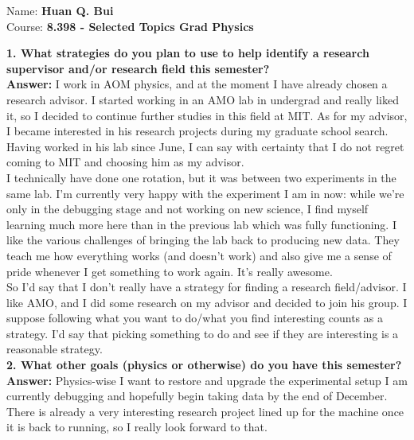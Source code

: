 \documentclass{article}
\theoremstyle{definition}
\begin{document}
		\begin{framed}
			\noindent Name: \textbf{Huan Q. Bui}\\
			Course: \textbf{8.398 - Selected Topics Grad Physics}
		\end{framed}
	
	
	
\noindent \textbf{1. What strategies do you plan to use to help identify a research supervisor and/or research field this semester?}\\


\noindent \textbf{Answer: } I work in AOM physics, and at the moment I have already chosen a research advisor. I started working in an AMO lab in undergrad and really liked it, so I decided to continue further studies in this field at MIT. As for my advisor, I became interested in his research projects during my graduate school search. Having worked in his lab since June, I can say with certainty that I do not regret coming to MIT and choosing him as my advisor. \\

\noindent I technically have done one rotation, but it was between two experiments in the same lab. I'm currently very happy with the experiment I am in now: while we're only in the debugging stage and not working on new science, I find myself learning much more here than in the previous lab which was fully functioning. I like the various challenges of bringing the lab back to producing new data. They teach me how everything works (and doesn't work) and also give me a sense of pride whenever I get something to work again. It's really awesome.  \\

\noindent So I'd say that I don't really have a strategy for finding a research field/advisor. I like AMO, and I did some research on my advisor and decided to join his group. I suppose following what you want to do/what you find interesting counts as a strategy. I'd say that picking something to do and see if they are interesting is a reasonable strategy.\\  

\noindent \textbf{2. What other goals (physics or otherwise) do you have this semester?}\\


\noindent \textbf{Answer:} Physics-wise I want to restore and upgrade the experimental setup I am currently debugging and hopefully begin taking data by the end of December. There is already a very interesting research project lined up for the machine once it is back to running, so I really look forward to that.  \\
\end{document}
